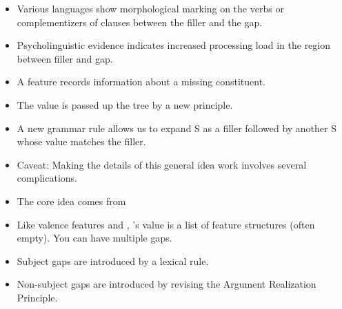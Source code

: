 \documentclass[a4paper,landscape,headrule,footrule]{foils}
\begin{document}





\begin{itemize}
\item Various languages show morphological marking
on the verbs or complementizers of clauses
between the filler and the gap.
\item Psycholinguistic evidence indicates increased
processing load in the region between filler and
gap.
\end{itemize}

\begin{itemize}
\item A feature  records information about a
missing constituent.
\item The  value is passed up the tree by a new
principle.
\item A new grammar rule allows us to expand S as a filler
followed by another S whose  value
matches the filler.
\item Caveat: Making the details of this general
idea work involves several complications.
\item The core idea comes from \citet{Gazdar:1981} 
\end{itemize}



\begin{itemize}
\item Like valence features and , ’s
value is a list of feature structures (often
empty).  You can have multiple gaps.
\item Subject gaps are introduced by a lexical rule.
\item Non-subject gaps are introduced by revising
the Argument Realization Principle.
\end{itemize}

\end{document}
